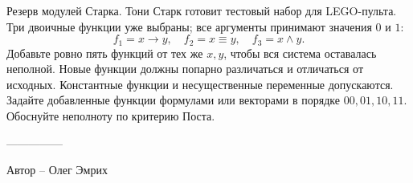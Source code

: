 \question
Резерв модулей Старка. Тони Старк готовит тестовый набор для LEGO-пульта. Три двоичные функции уже выбраны; все аргументы принимают значения $0$ и $1$:
\[
f_1=x\to y,\quad f_2=x\equiv y,\quad f_3=x\land y.
\]
Добавьте ровно пять функций от тех же $x,y$, чтобы вся система оставалась неполной. Новые функции должны попарно различаться и отличаться от исходных. Константные функции и несущественные переменные допускаются. Задайте добавленные функции формулами или векторами в порядке $00,01,10,11$. Обоснуйте неполноту по критерию Поста.

---------------

Автор -- Олег Эмрих
